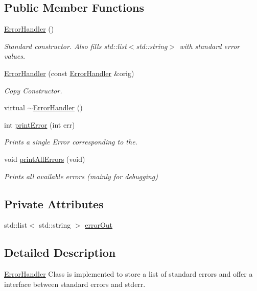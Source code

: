 \subsection*{Public Member Functions}
\begin{DoxyCompactItemize}
\item 
\mbox{\hyperlink{classErrorHandler_a7e5f379bd231442b898cef94556b2107}{Error\+Handler}} ()
\begin{DoxyCompactList}\small\item\em Standard constructor. Also fills std\+::list$<$std\+::string$>$ with standard error values. \end{DoxyCompactList}\item 
\mbox{\hyperlink{classErrorHandler_add20b373ee276ee2ef040f6dd913a86b}{Error\+Handler}} (const \mbox{\hyperlink{classErrorHandler}{Error\+Handler}} \&orig)
\begin{DoxyCompactList}\small\item\em Copy Constructor. \end{DoxyCompactList}\item 
virtual \mbox{\hyperlink{classErrorHandler_a73c7e690b864697e507aaeb537b3c3e5}{$\sim$\+Error\+Handler}} ()
\item 
int \mbox{\hyperlink{classErrorHandler_ab90b8248f24e3129df69d224585956dd}{print\+Error}} (int err)
\begin{DoxyCompactList}\small\item\em Prints a single Error corresponding to the. \end{DoxyCompactList}\item 
void \mbox{\hyperlink{classErrorHandler_a1108324c221544c928a2de3a2cf9ba98}{print\+All\+Errors}} (void)
\begin{DoxyCompactList}\small\item\em Prints all available errors (mainly for debugging) \end{DoxyCompactList}\end{DoxyCompactItemize}
\subsection*{Private Attributes}
\begin{DoxyCompactItemize}
\item 
std\+::list$<$ std\+::string $>$ \mbox{\hyperlink{classErrorHandler_aeb3bff116fcb83a58defbef8e8111f0e}{error\+Out}}
\end{DoxyCompactItemize}


\subsection{Detailed Description}
\mbox{\hyperlink{classErrorHandler}{Error\+Handler}} Class is implemented to store a list of standard errors and offer a interface between standard errors and stderr. 

